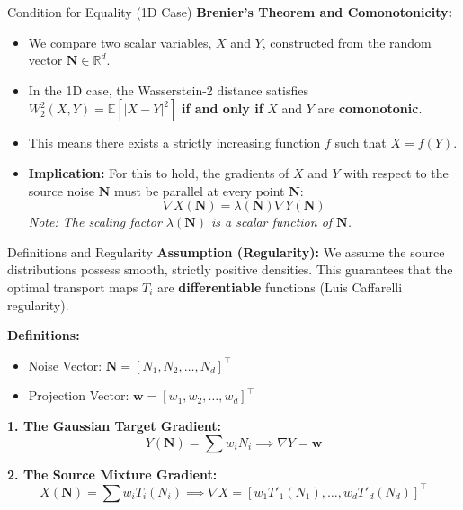 \documentclass{beamer}
\begin{document}
\begin{frame}{Condition for Equality (1D Case)}
  \textbf{Brenier's Theorem and Comonotonicity:}
  \begin{itemize}
    \item We compare two scalar variables, $X$ and $Y$, constructed from the random vector $\mathbf{N} \in \mathbb{R}^d$.
    \item In the 1D case, the Wasserstein-2 distance satisfies $W_2^2(X, Y) = \mathbb{E}[|X-Y|^2]$ \textbf{if and only if} $X$ and $Y$ are \textbf{comonotonic}.
    \item This means there exists a strictly increasing function $f$ such that $X = f(Y)$.
    \item \textbf{Implication:} For this to hold, the gradients of $X$ and $Y$ with respect to the source noise $\mathbf{N}$ must be parallel at every point $\mathbf{N}$:
    \[ \nabla X(\mathbf{N}) = \lambda(\mathbf{N}) \nabla Y(\mathbf{N}) \]
    \textit{Note: The scaling factor $\lambda(\mathbf{N})$ is a scalar function of $\mathbf{N}$.}
  \end{itemize}
\end{frame}

\begin{frame}{Definitions and Regularity}
  \textbf{Assumption (Regularity):}
  We assume the source distributions possess smooth, strictly positive densities. This guarantees that the optimal transport maps $T_i$ are \textbf{differentiable} functions (Luis Caffarelli regularity).

  \vspace{0.2cm}
  \textbf{Definitions:}
  \begin{itemize}
    \item Noise Vector: $\mathbf{N} = [N_1, N_2, \dots, N_d]^\top$
    \item Projection Vector: $\mathbf{w} = [w_1, w_2, \dots, w_d]^\top$
  \end{itemize}
  
  \textbf{1. The Gaussian Target Gradient:}
  \[ Y(\mathbf{N}) = \sum w_i N_i \implies \nabla Y = \mathbf{w} \]
  
  \textbf{2. The Source Mixture Gradient:}
  \[ X(\mathbf{N}) = \sum w_i T_i(N_i) \implies \nabla X = [w_1 T'_1(N_1), \dots, w_d T'_d(N_d)]^\top \]
\end{frame}
\end{document}
